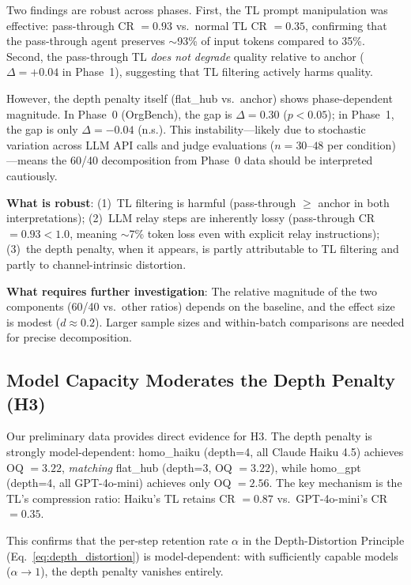 \documentclass[conference]{IEEEtran}
\begin{document}
Two findings are robust across phases.
First, the TL prompt manipulation was effective: pass-through CR $= 0.93$ vs.\ normal TL CR $= 0.35$, confirming that the pass-through agent preserves $\sim$93\% of input tokens compared to 35\%.
Second, the pass-through TL \emph{does not degrade} quality relative to anchor ($\Delta = +0.04$ in Phase~1), suggesting that TL filtering actively harms quality.

However, the depth penalty itself (flat\_hub vs.\ anchor) shows phase-dependent magnitude.
In Phase~0 (OrgBench), the gap is $\Delta = 0.30$ ($p < 0.05$); in Phase~1, the gap is only $\Delta = -0.04$ (n.s.).
This instability---likely due to stochastic variation across LLM API calls and judge evaluations ($n = 30$--$48$ per condition)---means the 60/40 decomposition from Phase~0 data should be interpreted cautiously.

\textbf{What is robust}: (1)~TL filtering is harmful (pass-through $\geq$ anchor in both interpretations); (2)~LLM relay steps are inherently lossy (pass-through CR $= 0.93 < 1.0$, meaning $\sim$7\% token loss even with explicit relay instructions); (3)~the depth penalty, when it appears, is partly attributable to TL filtering and partly to channel-intrinsic distortion.

\textbf{What requires further investigation}: The relative magnitude of the two components (60/40 vs.\ other ratios) depends on the baseline, and the effect size is modest ($d \approx 0.2$).
Larger sample sizes and within-batch comparisons are needed for precise decomposition.

\subsection{Model Capacity Moderates the Depth Penalty (H3)}
\label{subsec:h3_result}

Our preliminary data provides direct evidence for H3.
The depth penalty is strongly model-dependent:
homo\_haiku (depth=4, all Claude Haiku 4.5) achieves OQ $= 3.22$, \emph{matching} flat\_hub (depth=3, OQ $= 3.22$), while homo\_gpt (depth=4, all GPT-4o-mini) achieves only OQ $= 2.56$.
The key mechanism is the TL's compression ratio: Haiku's TL retains CR $= 0.87$ vs.\ GPT-4o-mini's CR $= 0.35$.

This confirms that the per-step retention rate $\alpha$ in the Depth-Distortion Principle (Eq.~\ref{eq:depth_distortion}) is model-dependent:
with sufficiently capable models ($\alpha \to 1$), the depth penalty vanishes entirely.
\end{document}
